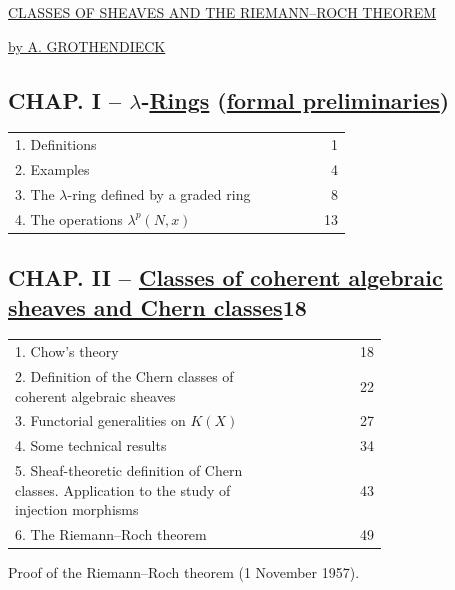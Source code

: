 \begin{center}
{\Large \underline{\underline{CLASSES OF SHEAVES AND THE RIEMANN--ROCH THEOREM}}}\par
\vspace{0.5em}
\underline{by A. GROTHENDIECK}
\end{center}

\subsection*{CHAP. I -- $\lambda$-\uline{Rings} (\uline{formal preliminaries})}
\begin{longtable}{@{}p{0.74\linewidth}r@{}}
1. Definitions & 1\\
2. Examples & 4\\
3. The $\lambda$-ring defined by a graded ring & 8\\
4. The operations $\lambda^p(N,x)$ & 13\\
\end{longtable}

\subsection*{CHAP. II -- \uline{Classes of coherent algebraic sheaves and Chern classes}\hfill 18}
\begin{longtable}{@{}p{0.74\linewidth}r@{}}
1. Chow's theory & 18\\
2. Definition of the Chern classes of coherent algebraic sheaves & 22\\
3. Functorial generalities on $K(X)$ & 27\\
4. Some technical results & 34\\
5. Sheaf-theoretic definition of Chern classes. Application to the study of injection morphisms & 43\\
6. The Riemann--Roch theorem & 49
\end{longtable}

\begin{center}
Proof of the Riemann--Roch theorem (1 November 1957).
\end{center}

